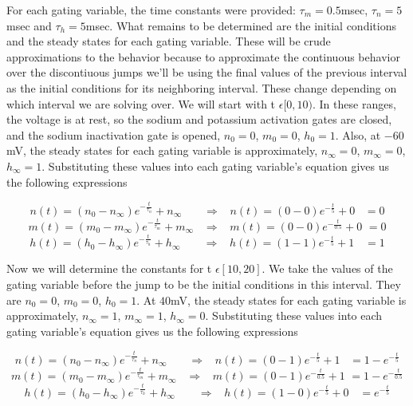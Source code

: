 \documentclass[letterpaper,10pt,english]{/usr/share/sphinx/texinputs/sphinxhowto}
\begin{document}
For each gating variable, the time constants were provided:
$\tau_m=0.5$msec, $\tau_n=5$msec and $\tau_h=5$msec. What remains to be
determined are the initial conditions and the steady states for each
gating variable. These will be crude approximations to the behavior
because to approximate the continuous behavior over the discontiuous
jumps we'll be using the final values of the previous interval as the
initial conditions for its neighboring interval. These change depending
on which interval we are solving over. We will start with t
$\epsilon [0,10)$. In these ranges, the voltage is at rest, so the
sodium and potassium activation gates are closed, and the sodium
inactivation gate is opened, $n_0=0$, $m_0=0$, $h_0=1$. Also, at
$-60$mV, the steady states for each gating variable is approximately,
$n_{\infty}=0$, $m_{\infty}=0$, $h_{\infty}=1$. Substituting these
values into each gating variable's equation gives us the following
expressions

\[n(t) = (n_0-n_{\infty})e^{-\frac{t}{\tau_n}}+n_{\infty} \hspace{23pt} \Rightarrow \hspace{10pt} n(t) = (0-0)e^{-\frac{t}{5}}+0 \hspace{10pt} = 0\]
\[m(t) = (m_0-m_{\infty})e^{-\frac{t}{\tau_m}}+m_{\infty} \hspace{10pt} \Rightarrow \hspace{10pt} m(t) = (0-0)e^{-\frac{t}{0.5}}+0 \hspace{4pt} = 0\]
\[h(t) = (h_0-h_{\infty})e^{-\frac{t}{\tau_h}}+h_{\infty} \hspace{24pt} \Rightarrow \hspace{10pt} h(t) = (1-1)e^{-\frac{t}{5}}+1 \hspace{11pt} = 1\]

Now we will determine the constants for t $\epsilon [10,20]$. We take
the values of the gating variable before the jump to be the initial
conditions in this interval. They are $n_0=0$, $m_0=0$, $h_0=1$. At
$40$mV, the steady states for each gating variable is approximately,
$n_{\infty}=1$, $m_{\infty}=1$, $h_{\infty}=0$. Substituting these
values into each gating variable's equation gives us the following
expressions

\[n(t) = (n_0-n_{\infty})e^{-\frac{t}{\tau_n}}+n_{\infty} \hspace{23pt} \Rightarrow \hspace{10pt} n(t) = (0-1)e^{-\frac{t}{5}}+1 \hspace{10pt} = 1-e^{-\frac{t}{5}}\]
\[m(t) = (m_0-m_{\infty})e^{-\frac{t}{\tau_m}}+m_{\infty} \hspace{10pt} \Rightarrow \hspace{10pt} m(t) = (0-1)e^{-\frac{t}{0.5}}+1 \hspace{4pt} = 1-e^{-\frac{t}{0.5}}\]
\[h(t) = (h_0-h_{\infty})e^{-\frac{t}{\tau_h}}+h_{\infty} \hspace{24pt} \Rightarrow \hspace{10pt} h(t) = (1-0)e^{-\frac{t}{5}}+0 \hspace{11pt} = e^{-\frac{t}{5}}\]
\end{document}
